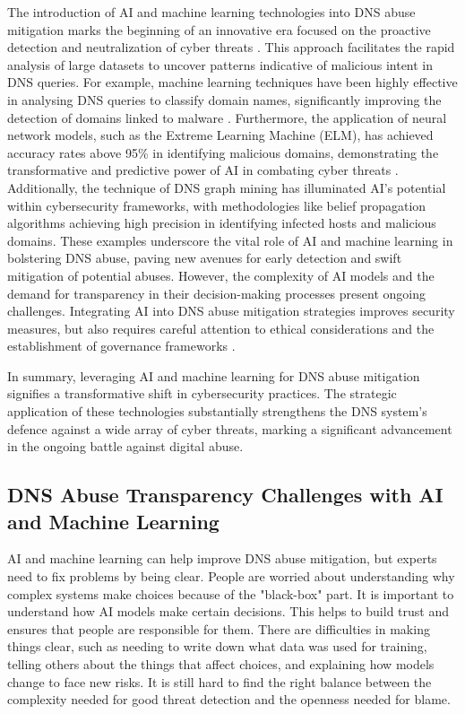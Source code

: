 The introduction of AI and machine learning technologies into DNS abuse mitigation marks the beginning of an innovative era focused on the proactive detection and neutralization of cyber threats \cite{tariq2023critical}.  This approach facilitates the rapid analysis of large datasets to uncover patterns indicative of malicious intent in DNS queries. For example, machine learning techniques have been highly effective in analysing DNS queries to classify domain names, significantly improving the detection of domains linked to malware \cite{LiMaliciousDomainDetection2020}. Furthermore, the application of neural network models, such as the Extreme Learning Machine (ELM), has achieved accuracy rates above 95\% in identifying malicious domains, demonstrating the transformative and predictive power of AI in combating cyber threats \cite{ZouDNSGraphMining2015}. Additionally, the technique of DNS graph mining has illuminated AI's potential within cybersecurity frameworks, with methodologies like belief propagation algorithms achieving high precision in identifying infected hosts and malicious domains. These examples underscore the vital role of AI and machine learning in bolstering DNS abuse, paving new avenues for early detection and swift mitigation of potential abuses. However, the complexity of AI models and the demand for transparency in their decision-making processes present ongoing challenges. Integrating AI into DNS abuse mitigation strategies improves security measures, but also requires careful attention to ethical considerations and the establishment of governance frameworks \cite{AntonakakisMalwareDomainsUpperDNS2011}.

In summary, leveraging AI and machine learning for DNS abuse mitigation signifies a transformative shift in cybersecurity practices. The strategic application of these technologies substantially strengthens the DNS system's defence against a wide array of cyber threats, marking a significant advancement in the ongoing battle against digital abuse.

\subsection{DNS Abuse Transparency Challenges with AI and Machine Learning}

AI and machine learning can help improve DNS abuse mitigation, but experts need to fix problems by being clear. People are worried about understanding why complex systems make choices because of the "black-box" part. It is important to understand how AI models make certain decisions. This helps to build trust and ensures that people are responsible for them. There are difficulties in making things clear, such as needing to write down what data was used for training, telling others about the things that affect choices, and explaining how models change to face new risks. It is still hard to find the right balance between the complexity needed for good threat detection and the openness needed for blame.

